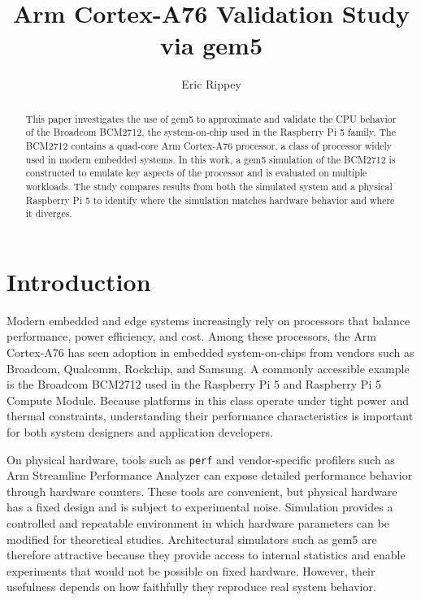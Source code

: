 \documentclass[acmlarge]{acmart}
\begin{document}
\title{Arm Cortex-A76 Validation Study via gem5}

\author{Eric Rippey}


\begin{abstract}
This paper investigates the use of gem5 to approximate and validate the CPU
behavior of the Broadcom BCM2712, the system-on-chip used in the Raspberry Pi 5
family. The BCM2712 contains a quad-core Arm Cortex-A76 processor, a class of
processor widely used in modern embedded systems. In this work, a gem5 simulation
of the BCM2712 is constructed to emulate key aspects of the processor and is
evaluated on multiple workloads. The study compares results from both the
simulated system and a physical Raspberry Pi 5 to identify where the simulation
matches hardware behavior and where it diverges.
\end{abstract}





\maketitle

\section{Introduction}
Modern embedded and edge systems increasingly rely on processors that balance
performance, power efficiency, and cost. Among these processors, the Arm
Cortex-A76 has seen adoption in embedded system-on-chips from vendors such as
Broadcom, Qualcomm, Rockchip, and Samsung. A commonly accessible example is the
Broadcom BCM2712 used in the Raspberry Pi 5 and Raspberry Pi 5 Compute Module.
Because platforms in this class operate under tight power and thermal
constraints, understanding their performance characteristics is important for
both system designers and application developers.

On physical hardware, tools such as \texttt{perf} and vendor-specific profilers
such as Arm Streamline Performance Analyzer can expose detailed performance
behavior through hardware counters. These tools are convenient, but physical
hardware has a fixed design and is subject to experimental noise. Simulation
provides a controlled and repeatable environment in which hardware parameters can
be modified for theoretical studies. Architectural simulators such as gem5 are
therefore attractive because they provide access to internal statistics and
enable experiments that would not be possible on fixed hardware. However, their
usefulness depends on how faithfully they reproduce real system behavior.
\end{document}
